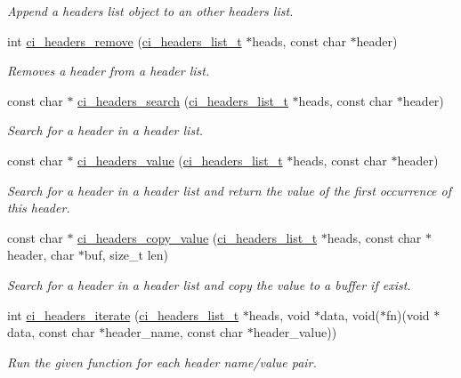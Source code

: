 \begin{DoxyCompactItemize}
\begin{DoxyCompactList}\small\item\em Append a headers list object to an other headers list. \item\end{DoxyCompactList}\item 
int \hyperlink{group__HEADERS_ga852cd720c302a7d1b835f63364709e09}{ci\_\-headers\_\-remove} (\hyperlink{group__HEADERS_gaaa203ac92dd0242ab66f4237548d7260}{ci\_\-headers\_\-list\_\-t} $\ast$heads, const char $\ast$header)
\begin{DoxyCompactList}\small\item\em Removes a header from a header list. \item\end{DoxyCompactList}\item 
const char $\ast$ \hyperlink{group__HEADERS_ga6926728df76776452cfd5b887fbc6ea3}{ci\_\-headers\_\-search} (\hyperlink{group__HEADERS_gaaa203ac92dd0242ab66f4237548d7260}{ci\_\-headers\_\-list\_\-t} $\ast$heads, const char $\ast$header)
\begin{DoxyCompactList}\small\item\em Search for a header in a header list. \item\end{DoxyCompactList}\item 
const char $\ast$ \hyperlink{group__HEADERS_ga6a862010fd4c98f189e2671291bac42a}{ci\_\-headers\_\-value} (\hyperlink{group__HEADERS_gaaa203ac92dd0242ab66f4237548d7260}{ci\_\-headers\_\-list\_\-t} $\ast$heads, const char $\ast$header)
\begin{DoxyCompactList}\small\item\em Search for a header in a header list and return the value of the first occurrence of this header. \item\end{DoxyCompactList}\item 
const char $\ast$ \hyperlink{group__HEADERS_ga1f67d85d126fbc2a4aacff2fcb05b851}{ci\_\-headers\_\-copy\_\-value} (\hyperlink{group__HEADERS_gaaa203ac92dd0242ab66f4237548d7260}{ci\_\-headers\_\-list\_\-t} $\ast$heads, const char $\ast$header, char $\ast$buf, size\_\-t len)
\begin{DoxyCompactList}\small\item\em Search for a header in a header list and copy the value to a buffer if exist. \item\end{DoxyCompactList}\item 
int \hyperlink{group__HEADERS_ga3481363b97dcfaaf8af07d4fddb9704c}{ci\_\-headers\_\-iterate} (\hyperlink{group__HEADERS_gaaa203ac92dd0242ab66f4237548d7260}{ci\_\-headers\_\-list\_\-t} $\ast$heads, void $\ast$data, void($\ast$fn)(void $\ast$data, const char $\ast$header\_\-name, const char $\ast$header\_\-value))
\begin{DoxyCompactList}\small\item\em Run the given function for each header name/value pair. \item\end{DoxyCompactList}\end{DoxyCompactItemize}


